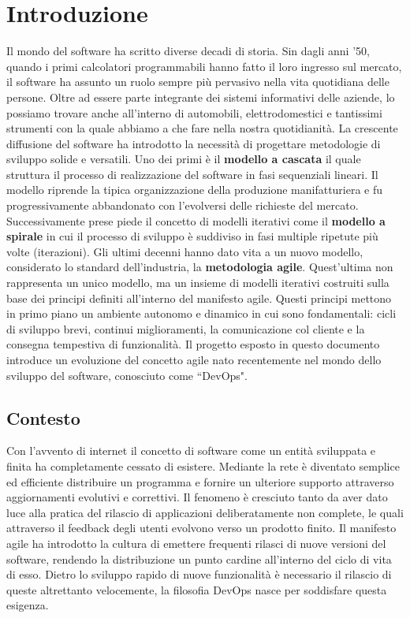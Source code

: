 
\chapter{Introduzione}\label{chap:introduction}
Il mondo del software ha scritto diverse decadi di storia. Sin dagli anni '50, quando i primi calcolatori programmabili hanno fatto il loro ingresso sul mercato, il software ha assunto un ruolo sempre più pervasivo nella vita quotidiana delle persone. Oltre ad essere parte integrante dei sistemi informativi delle aziende, lo possiamo trovare anche all'interno di automobili, elettrodomestici e tantissimi strumenti con la quale abbiamo a che fare nella nostra quotidianità. La crescente diffusione del software ha introdotto la necessità di progettare metodologie di sviluppo solide e versatili. Uno dei primi è il \textbf{modello a cascata} il quale struttura il processo di realizzazione del software in fasi sequenziali lineari. Il modello riprende la tipica organizzazione della produzione manifatturiera e fu progressivamente abbandonato con l'evolversi delle richieste del mercato. Successivamente prese piede il concetto di modelli iterativi come il \textbf{modello a spirale} in cui il processo di sviluppo è suddiviso in fasi multiple ripetute più volte (iterazioni). Gli ultimi decenni hanno dato vita a un nuovo modello, considerato lo standard dell'industria, la \textbf{metodologia agile}. Quest'ultima non rappresenta un unico modello, ma un insieme di modelli iterativi costruiti sulla base dei principi definiti all'interno del manifesto agile. Questi principi mettono in primo piano un ambiente autonomo e dinamico in cui sono fondamentali: cicli di sviluppo brevi, continui miglioramenti, la comunicazione col cliente e la consegna tempestiva di funzionalità. Il progetto esposto in questo documento introduce un evoluzione del concetto agile nato recentemente nel mondo dello sviluppo del software, conosciuto come ``DevOps".

\section{Contesto}
Con l'avvento di internet il concetto di software come un entità sviluppata e finita ha completamente cessato di esistere. Mediante la rete è diventato semplice ed efficiente distribuire un programma e fornire un ulteriore supporto attraverso aggiornamenti evolutivi e correttivi. Il fenomeno è cresciuto tanto da aver dato luce alla pratica del rilascio di applicazioni deliberatamente non complete, le quali attraverso il feedback degli utenti evolvono verso un prodotto finito. Il manifesto agile ha introdotto la cultura di emettere frequenti rilasci di nuove versioni del software, rendendo la distribuzione un punto cardine all'interno del ciclo di vita di esso. Dietro lo sviluppo rapido di nuove funzionalità è necessario il rilascio di queste altrettanto velocemente, la filosofia DevOps nasce per soddisfare questa esigenza.

